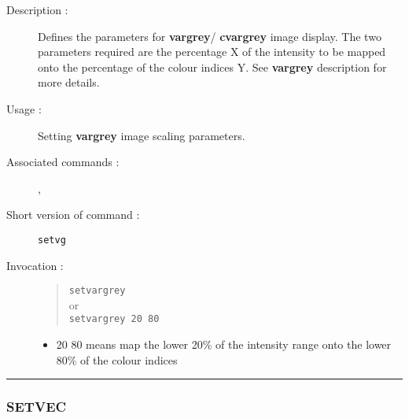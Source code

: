 \begin{description}

\item[Description :] Defines the parameters for {\bf vargrey}/{\bf
cvargrey} image display.  The two parameters required are the
percentage X of the intensity to be mapped onto the percentage of the
colour indices Y.  See {\bf vargrey} description for more details.

\item[Usage :] Setting {\bf vargrey} image scaling parameters.

\item[Associated commands :] {\tt {}}, 
{\tt {}}

\item[Short version of command :] {\tt setvg}
\item[Invocation :]

\begin{quote}{\tt  setvargrey }\\
or \\
{\tt setvargrey 20 80 }
\end{quote}

\begin{itemize}

\item 20 80 means map the lower 20\% of the intensity range onto
 the lower 80\% of the colour indices

\end{itemize}

\end{description}

\hrule 
\subsubsection*{\label{SETVEC}SETVEC}

